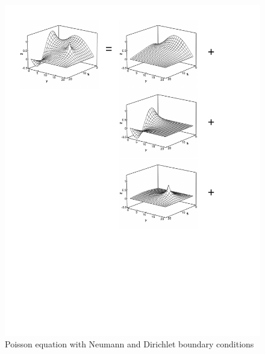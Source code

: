\begin{figure}[htbp]
\includegraphics[width=6in]{../figures/SES/example_Laplace+Poisson+Neumann.pdf}
\caption{Poisson equation with Neumann and Dirichlet boundary conditions}
\label{fig:example-Laplace-Poisson-Neumann}
\end{figure}



